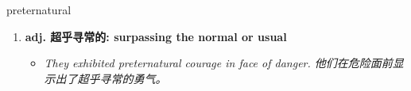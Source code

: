 
\begin{frame}
{\huge preternatural}
\begin{center}
\begin{enumerate}\Large
  \item \textbf{adj. 超乎寻常的: surpassing the normal or usual}
  \begin{itemize}
    \item \em{\Large{They exhibited preternatural courage in face of danger. 他们在危险面前显示出了超乎寻常的勇气。}}
  \end{itemize}
\end{enumerate}
\end{center}
\end{frame}

